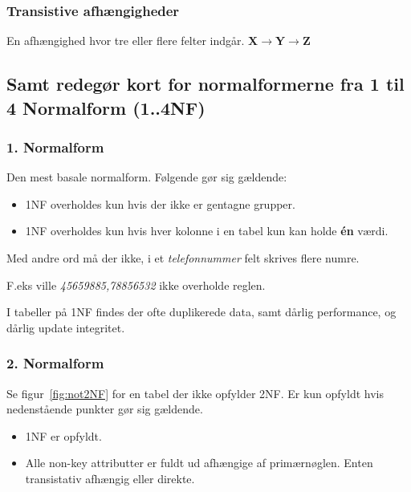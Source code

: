 \subsubsection{Transistive afhængigheder}
En afhængighed hvor tre eller flere felter indgår.
\textbf{X$\rightarrow$Y$\rightarrow$Z}


\subsection{Samt redegør kort for normalformerne fra 1 til 4 Normalform (1..4NF)}

\subsubsection{1. Normalform}
Den mest basale normalform. Følgende gør sig gældende:

\begin{itemize}
	\item 1NF overholdes kun hvis der ikke er gentagne grupper.
	\item 1NF overholdes kun hvis hver kolonne i en tabel kun kan holde \textbf{én} værdi. 
\end{itemize}

Med andre ord må der ikke, i et \textit{telefonnummer} felt skrives flere numre. 

F.eks ville \textit{45659885,78856532} ikke overholde reglen.


I tabeller på 1NF findes der ofte duplikerede data, samt dårlig performance, og dårlig update integritet.
	
\subsubsection{2. Normalform}
Se figur~\ref{fig:not2NF} for en tabel der ikke opfylder 2NF. Er kun opfyldt hvis nedenstående punkter gør sig gældende. 
	
\begin{itemize}
	\item 1NF er opfyldt.
	\item Alle non-key attributter er fuldt ud afhængige af primærnøglen. Enten transistativ afhængig eller direkte.
\end{itemize}

